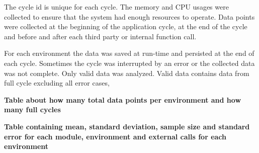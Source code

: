 The cycle id is unique for each cycle.
The memory and CPU usages were collected to ensure that the system had enough resources to operate.
Data points were collected at the beginning of the application cycle, at the end of the cycle and before and after each third party or internal function call.

For each environment the data was saved at run-time and persisted at the end of each cycle.
Sometimes the cycle was interrupted by an error or the collected data was not complete.
Only valid data was analyzed.
Valid data contains data from full cycle excluding all error cases,

\textbf{Table about how many total data points per environment and how many full cycles}

\textbf{Table containing mean, standard deviation, sample size and standard error for each module, environment and external calls for each environment}











